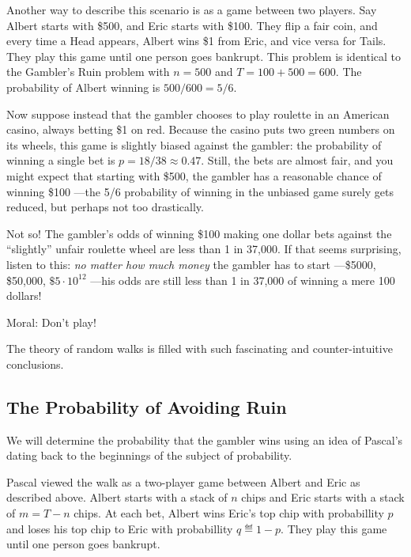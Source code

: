Another way to describe this scenario is as a game between two
players.  Say Albert starts with \$500, and Eric starts with \$100.
They flip a fair coin, and every time a Head appears, Albert wins \$1
from Eric, and vice versa for Tails.  They play this game until one
person goes bankrupt.  This problem is identical to the Gambler's Ruin
problem with $n=500$ and $T=100+500=600$.  The probability of
Albert winning is $500/600 = 5/6$.\iffalse , namely, the ratio of his
wealth to the combined wealth.  Eric's chance of winnning is $1/6$.\fi


Now suppose instead that the gambler chooses to play roulette in an
American casino, always betting \$1 on red.  Because the casino puts
two green numbers on its wheels, this game is slightly biased against
the gambler: the probability of winning a single bet is $p = 18/38
\approx 0.47$.  Still, the bets are almost fair, and you might expect
that starting with \$500, the gambler has a reasonable chance of
winning \$100 ---the 5/6 probability of winning in the unbiased game
surely gets reduced, but perhaps not too drastically.

Not so!  The gambler's odds of winning \$100 making one dollar bets
against the ``slightly'' unfair roulette wheel are less than 1 in 37,000.
If that seems surprising, listen to this: \emph{no matter how much money}
the gambler has to start ---\$5000, \$50,000, $\$5 \cdot 10^{12}$ ---his
odds are still less than 1 in 37,000 of winning a mere 100 dollars!

Moral:  Don't play!

The theory of random walks is filled with such fascinating and
counter-intuitive conclusions.

\subsection{The Probability of Avoiding Ruin}\label{prwinwalk_subsec}

We will determine the probability that the gambler wins using an idea
of Pascal's dating back to the beginnings of the subject of
probability.

Pascal viewed the walk as a two-player game between Albert and Eric as
described above.  Albert starts with a stack of $n$ chips and Eric
starts with a stack of $m = T-n$ chips.  At each bet, Albert wins
Eric's top chip with probabillity $p$ and loses his top chip to Eric
with probabillity $q \eqdef 1-p$.  They play this game until one
person goes bankrupt.

